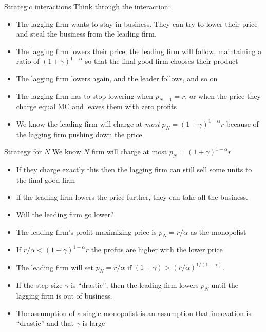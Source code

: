 \begin{frame}{Strategic interactions}
Think through the interaction:
\begin{itemize}
	\item The lagging firm wants to stay in business. They can try to lower their price and steal the business from the leading firm. 
	\item The lagging firm lowers their price, the leading firm will follow, maintaining a ratio of $(1+\gamma)^{1-\alpha}$ so that the final good firm chooses their product
	\item The lagging firm lowers again, and the leader follows, and so on
	\item The lagging firm has to stop lowering when $p_{N-1} = r$, or when the price they charge equal MC and leaves them with zero profits
	\item We know the leading firm will charge at \textit{most} $p_N = (1+\gamma)^{1-\alpha}r$ because of the lagging firm pushing down the price
\end{itemize}
\end{frame}

\begin{frame}{Strategy for $N$}
We know $N$ firm will charge at most $p_N = (1+\gamma)^{1-\alpha}r$
\begin{itemize}
	\item If they charge exactly this then the lagging firm can still sell some units to the final good firm 
	\item if the leading firm lowers the price further, they can take all the business.
	\item Will the leading firm go lower? 
	\item The leading firm's profit-maximizing price is $p_N = r/\alpha$ as the monopolist
	\item If $r/\alpha < (1+\gamma)^{1-\alpha}r$ the profits are higher with the lower price
	\item The leading firm will set $p_N = r/\alpha$ if $(1+\gamma) > (r/\alpha)^{1/(1-\alpha)}$. 
	\item If the step size $\gamma$ is ``drastic'', then the leading firm lowers $p_N$ until the lagging firm is out of business.
	\item The assumption of a single monopolist is an assumption that innovation is ``drastic'' and that $\gamma$ is large
\end{itemize}
\end{frame}

